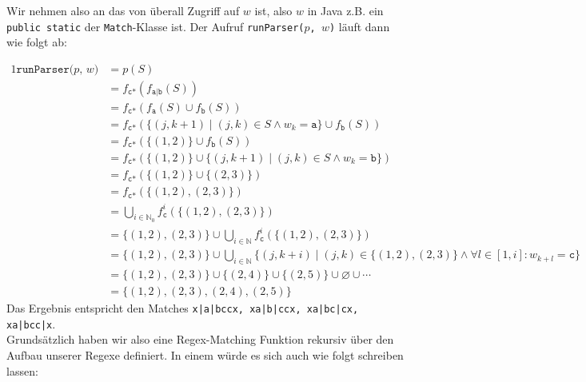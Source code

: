 \documentclass[a4paper,graphics,11pt]{article}
\begin{document}
Wir nehmen also an das von überall Zugriff auf $w$ ist, also $w$ in Java z.B. ein \texttt{public static} der \texttt{Match}-Klasse
ist.
Der Aufruf \texttt{runParser($p$, $w$)} läuft dann wie folgt ab:

\newpage
\begin{alignat*}{1}
    \texttt{runParser($p$, $w$)}
    &= p(S)\\
    &= f_\texttt{c*}(f_\texttt{a|b}(S))\\
    &= f_\texttt{c*}(f_\texttt{a}(S) \cup f_\texttt{b}(S))\\
    &= f_\texttt{c*}(\{(j,k+1) \mid (j,k) \in S \land w_k = \texttt{a}\} \cup f_\texttt{b}(S))\\
    &= f_\texttt{c*}(\{(1,2)\} \cup f_\texttt{b}(S))\\
    &= f_\texttt{c*}(\{(1,2)\} \cup \{(j,k+1) \mid (j,k) \in S \land w_k = \texttt{b}\})\\
    &= f_\texttt{c*}(\{(1,2)\} \cup \{(2,3)\})\\
    &= f_\texttt{c*}(\{(1,2),(2,3)\})\\
    &= \bigcup_{i \in \mathbb{N}_0} f_\texttt{c}^i(\{(1,2),(2,3)\})\\
    &= \{(1,2),(2,3)\} \cup \bigcup_{i \in \mathbb{N}} f_\texttt{c}^i(\{(1,2),(2,3)\})\\
    &= \{(1,2),(2,3)\} \cup \bigcup_{i \in \mathbb{N}} \{(j, k+i) \mid (j,k) \in \{(1,2),(2,3)\} \land \forall l \in [1,i] : w_{k+l} = \texttt{c}\}\\
    &= \{(1,2),(2,3)\} \cup \{(2,4)\} \cup \{(2,5)\} \cup \varnothing \cup \cdots\\
    &= \{(1,2),(2,3),(2,4),(2,5)\}
\end{alignat*}
Das Ergebnis entspricht den Matches \texttt{x|a|bccx, xa|b|ccx, xa|bc|cx, xa|bcc|x}.\\

Grundsätzlich haben wir also eine Regex-Matching Funktion rekursiv über den Aufbau unserer Regexe definiert.
In einem würde es sich auch wie folgt schreiben lassen:
\end{document}
